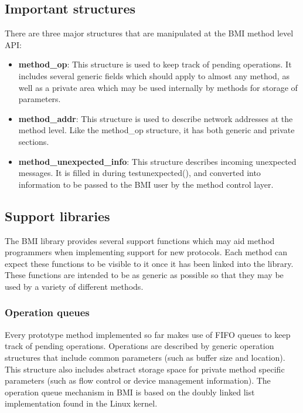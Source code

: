\documentclass[11pt]{article}
\begin{document}
\subsection{Important structures}

There are three major structures that are manipulated at the BMI
method level API:

\begin{itemize}
\item \textbf{method\_op}:  This structure is used to keep track
of pending operations.  It includes several generic fields which
should apply to almost any method, as well as a private area which
may be used internally by methods for storage of parameters.
\item \textbf{method\_addr}:  This structure is used to describe
network addresses at the method level.  Like the method\_op
structure, it has both generic and private sections.
\item \textbf{method\_unexpected\_info}: This structure describes
incoming unexpected messages.  It is filled in during
testunexpected(), and converted into information to be passed to
the BMI user by the method control layer.
\end{itemize}

\subsection{Support libraries}
\label{sec:support}

The BMI library provides several support functions which may aid
method programmers when implementing support for new protocols.  Each
method can expect these functions to be visible to it once it has been
linked into the library.
These functions are
intended to be as generic as possible so that they may be used by a
variety of different methods.

\subsubsection{Operation queues}

Every prototype method implemented so far makes use of FIFO queues to
keep track of pending operations.  Operations are described by generic
operation structures that include common parameters (such as buffer
size and location).  This structure also includes abstract storage space
for private method specific parameters (such as flow control or device
management information).  The operation queue mechanism in BMI is based
on the doubly linked list implementation found in the Linux kernel. 
\end{document}
